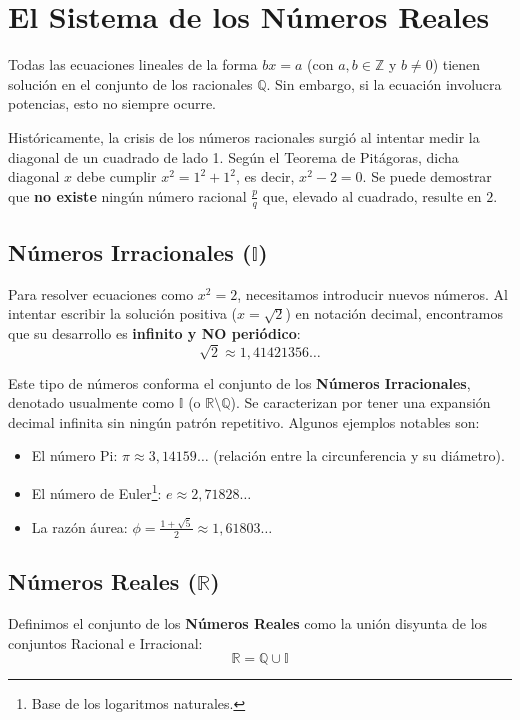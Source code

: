 \section{El Sistema de los Números Reales}

Todas las ecuaciones lineales de la forma $bx=a$ (con $a,b\in\mathbb{Z}$ y $b\neq 0$) tienen solución en el conjunto de los racionales $\mathbb{Q}$. Sin embargo, si la ecuación involucra potencias, esto no siempre ocurre.

Históricamente, la crisis de los números racionales surgió al intentar medir la diagonal de un cuadrado de lado 1. Según el Teorema de Pitágoras, dicha diagonal $x$ debe cumplir $x^2 = 1^2 + 1^2$, es decir, $x^2-2=0$. Se puede demostrar que \textbf{no existe} ningún número racional $\frac{p}{q}$ que, elevado al cuadrado, resulte en $2$.

\subsection{Números Irracionales ($\mathbb{I}$)}
Para resolver ecuaciones como $x^2=2$, necesitamos introducir nuevos números. Al intentar escribir la solución positiva ($x=\sqrt{2}$) en notación decimal, encontramos que su desarrollo es \textbf{infinito y NO periódico}:
\[ \sqrt{2} \approx 1,41421356\dots \]

Este tipo de números conforma el conjunto de los \textbf{Números Irracionales}, denotado usualmente como $\mathbb{I}$ (o $\mathbb{R} \setminus \mathbb{Q}$). Se caracterizan por tener una expansión decimal infinita sin ningún patrón repetitivo. Algunos ejemplos notables son:
\begin{itemize}
    \item El número Pi: $\pi \approx 3,14159\dots$ (relación entre la circunferencia y su diámetro).
    \item El número de Euler\footnote{Base de los logaritmos naturales.}: $e \approx 2,71828\dots$
    \item La razón áurea: $\phi = \frac{1+\sqrt{5}}{2} \approx 1,61803\dots$
\end{itemize}

\subsection{Números Reales ($\mathbb{R}$)}
Definimos el conjunto de los \textbf{Números Reales} como la unión disyunta de los conjuntos Racional e Irracional:
\[ \mathbb{R} = \mathbb{Q} \cup \mathbb{I} \]

